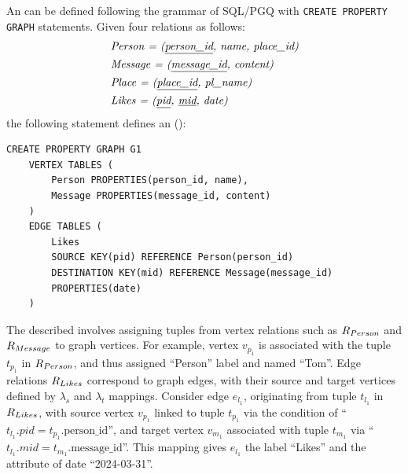 \begin{example}
    \label{ex:rgmapping}
    An \rgmapping can be defined following the grammar of SQL/PGQ with \lstinline{CREATE PROPERTY GRAPH} statements.
    Given four relations as follows:
    \begin{equation*}
        \begin{split}
            & \textit{Person = (\underline{person\_id}, name, place\_id)} \\
            & \textit{Message = (\underline{message\_id}, content)} \\
            & \textit{Place = (\underline{place\_id}, pl\_name)} \\
            & \textit{Likes = (\underline{pid}, \underline{mid}, date)}
        \end{split}
    \end{equation*}
    the following statement defines an \rgmapping ():
    \begin{lstlisting}
CREATE PROPERTY GRAPH G1
    VERTEX TABLES (
        Person PROPERTIES(person_id, name),
        Message PROPERTIES(message_id, content)
    )
    EDGE TABLES (
        Likes
        SOURCE KEY(pid) REFERENCE Person(person_id)
        DESTINATION KEY(mid) REFERENCE Message(message_id)
        PROPERTIES(date)
    )
    \end{lstlisting}
    The described \rgmapping involves assigning tuples from vertex relations such as ${R_{Person}}$ and ${R_{Message}}$ to graph vertices. For example, vertex $v_{p_1}$ is associated with the tuple $t_{p_1}$ in ${R_{Person}}$, and thus assigned ``Person'' label and named ``Tom''. Edge relations ${R_{Likes}}$ correspond to graph edges, with their source and target vertices defined by $\lambda_s$ and $\lambda_t$ mappings. Consider edge $e_{l_1}$, originating from tuple $t_{l_1}$ in ${R_{Likes}}$, with source vertex $v_{p_1}$ linked to tuple $t_{p_1}$ via the condition of
    ``$t_{l_1}.pid = t_{p_1}.\text{person\_id}$'', and target vertex $v_{m_1}$ associated with tuple $t_{m_1}$
    via ``$t_{l_1}.mid = t_{m_1}.\text{message\_id}$''. This mapping gives $e_{l_1}$ the label ``Likes'' and the attribute of date ``2024-03-31''.
\end{example}


